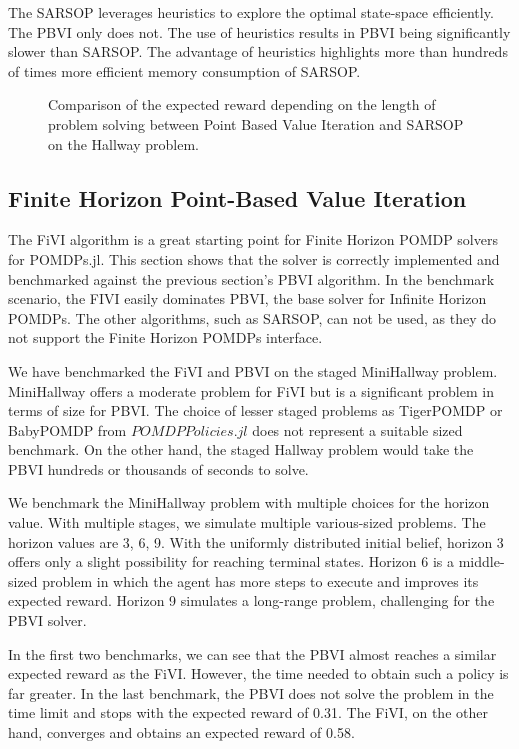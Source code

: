 The SARSOP leverages heuristics to explore the optimal state-space efficiently. The PBVI only does not. The use of heuristics results in PBVI being significantly slower than SARSOP. The advantage of heuristics highlights more than hundreds of times more efficient memory consumption of SARSOP.


\begin{figure}[ht]
    \centering
    \caption{Comparison of the expected reward depending on the length of problem solving between Point Based Value Iteration and SARSOP on the Hallway problem.}
    \label{graph3}
\end{figure}


\subsection{Finite Horizon Point-Based Value Iteration}
The FiVI algorithm is a great starting point for Finite Horizon POMDP solvers for POMDPs.jl. This section shows that the solver is correctly implemented and benchmarked against the previous section's PBVI algorithm. In the benchmark scenario, the FIVI easily dominates PBVI, the base solver for Infinite Horizon POMDPs. The other algorithms, such as SARSOP, can not be used, as they do not support the Finite Horizon POMDPs interface. 

We have benchmarked the FiVI and PBVI on the staged MiniHallway problem. MiniHallway offers a moderate problem for FiVI but is a significant problem in terms of size for PBVI. The choice of lesser staged problems as TigerPOMDP or BabyPOMDP from $POMDPPolicies.jl$ does not represent a suitable sized benchmark. On the other hand, the staged Hallway problem would take the PBVI hundreds or thousands of seconds to solve. 

We benchmark the MiniHallway problem with multiple choices for the horizon value. With multiple stages, we simulate multiple various-sized problems. The horizon values are 3, 6, 9. With the uniformly distributed initial belief, horizon 3 offers only a slight possibility for reaching terminal states. Horizon 6 is a middle-sized problem in which the agent has more steps to execute and improves its expected reward. Horizon 9 simulates a long-range problem, challenging for the PBVI solver.

In the first two benchmarks, we can see that the PBVI almost reaches a similar expected reward as the FiVI. However, the time needed to obtain such a policy is far greater. In the last benchmark, the PBVI does not solve the problem in the time limit and stops with the expected reward of 0.31. The FiVI, on the other hand, converges and obtains an expected reward of 0.58.

